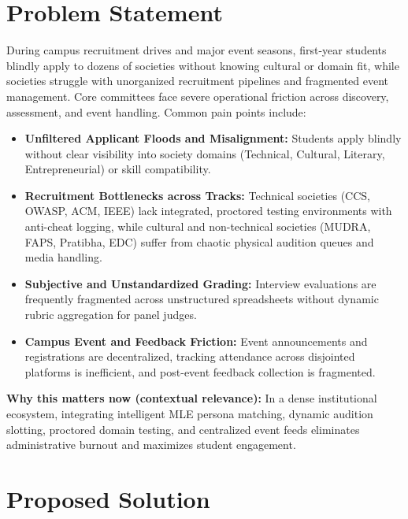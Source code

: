 \documentclass[11pt,a4paper]{article}
\begin{document}
\section{Problem Statement}
During campus recruitment drives and major event seasons, first-year students blindly apply to dozens of societies without knowing cultural or domain fit, while societies struggle with unorganized recruitment pipelines and fragmented event management. Core committees face severe operational friction across discovery, assessment, and event handling. Common pain points include:
\begin{itemize}[leftmargin=0.7cm]
    \item \textbf{Unfiltered Applicant Floods and Misalignment:} Students apply blindly without clear visibility into society domains (Technical, Cultural, Literary, Entrepreneurial) or skill compatibility.
    \item \textbf{Recruitment Bottlenecks across Tracks:} Technical societies (CCS, OWASP, ACM, IEEE) lack integrated, proctored testing environments with anti-cheat logging, while cultural and non-technical societies (MUDRA, FAPS, Pratibha, EDC) suffer from chaotic physical audition queues and media handling.
    \item \textbf{Subjective and Unstandardized Grading:} Interview evaluations are frequently fragmented across unstructured spreadsheets without dynamic rubric aggregation for panel judges.
    \item \textbf{Campus Event and Feedback Friction:} Event announcements and registrations are decentralized, tracking attendance across disjointed platforms is inefficient, and post-event feedback collection is fragmented.
\end{itemize}

\textbf{Why this matters now (contextual relevance):} In a dense institutional ecosystem, integrating intelligent MLE persona matching, dynamic audition slotting, proctored domain testing, and centralized event feeds eliminates administrative burnout and maximizes student engagement.

\section{Proposed Solution}
\end{document}

